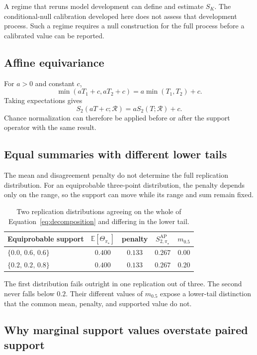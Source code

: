 \documentclass[11pt]{article}
\newcommand{\Regime}{\mathcal{R}}
\newcommand{\E}{\mathbb{E}}
\newcommand{\SAP}{S_{2,\pi_\star}^{\mathrm{AP}}}
\theoremstyle{remark}
\begin{document}
A regime that reruns model development can define and estimate $S_K$. The conditional-null calibration developed here does not assess that development process. Such a regime requires a null construction for the full process before a calibrated value can be reported.

\subsection{Affine equivariance}
\label{app:affine-equivariance}

For $a>0$ and constant $c$,
\[
\min(aT_1+c,aT_2+c)
=
a\min(T_1,T_2)+c.
\]
Taking expectations gives
\[
S_2(aT+c;\Regime)=aS_2(T;\Regime)+c.
\]
Chance normalization can therefore be applied before or after the support operator with the same result.

\subsection{Equal summaries with different lower tails}
\label{app:collision-tail}

The mean and disagreement penalty do not determine the full replication distribution. For an equiprobable three-point distribution, the penalty depends only on the range, so the support can move while its range and sum remain fixed.

\begin{table}[ht]
\centering
\caption{Two replication distributions agreeing on the whole of Equation~\eqref{eq:decomposition} and differing in the lower tail.}
\label{tab:collision-tail}
\begin{tabular}{@{}lcccc@{}}
\toprule
Equiprobable support & $\E[\Theta_{\pi_\star}]$ & penalty & $\SAP$ & $m_{0.5}$ \\
\midrule
$\{0.0,\,0.6,\,0.6\}$ & $0.400$ & $0.133$ & $0.267$ & $0.00$ \\
$\{0.2,\,0.2,\,0.8\}$ & $0.400$ & $0.133$ & $0.267$ & $0.20$ \\
\bottomrule
\end{tabular}
\end{table}

The first distribution fails outright in one replication out of three. The second never falls below $0.2$. Their different values of $m_{0.5}$ expose a lower-tail distinction that the common mean, penalty, and supported value do not.

\subsection{Why marginal support values overstate paired support}
\label{app:marginal-proof}
\end{document}
